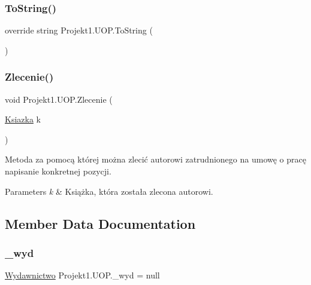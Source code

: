 \subsubsection{\texorpdfstring{ToString()}{ToString()}}
{\footnotesize\ttfamily override string Projekt1.\+U\+O\+P.\+To\+String (\begin{DoxyParamCaption}{ }\end{DoxyParamCaption})}

\mbox{\label{class_projekt1_1_1_u_o_p_aa2f46bfc4700f601a35eaa4d99b21727}} 
\subsubsection{\texorpdfstring{Zlecenie()}{Zlecenie()}}
{\footnotesize\ttfamily void Projekt1.\+U\+O\+P.\+Zlecenie (\begin{DoxyParamCaption}\item[{\mbox{\hyperlink{class_projekt1_1_1_ksiazka}{Ksiazka}}}]{k }\end{DoxyParamCaption})}



Metoda za pomocą której można zlecić autorowi zatrudnionego na umowę o pracę napisanie konkretnej pozycji. 


\begin{DoxyParams}{Parameters}
{\em k} & Książka, która została zlecona autorowi.\\
\hline
\end{DoxyParams}


\subsection{Member Data Documentation}
\mbox{\label{class_projekt1_1_1_u_o_p_aba15bdd02a03a7cabe932f4131b996c2}} 
\subsubsection{\texorpdfstring{\_wyd}{\_wyd}}
{\footnotesize\ttfamily \mbox{\hyperlink{class_projekt1_1_1_wydawnictwo}{Wydawnictwo}} Projekt1.\+U\+O\+P.\+\_\+wyd = null\hspace{0.3cm}{\ttfamily [private]}}



